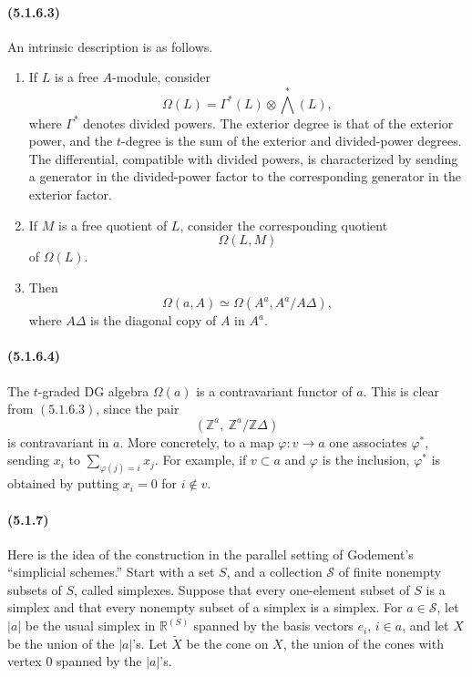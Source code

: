 \documentclass[11pt]{article}
\theoremstyle{remark}
\newcommand{\ZZ}{\mathbb{Z}}
\newcommand{\RR}{\mathbb{R}}
\begin{document}
\paragraph{(5.1.6.3)}
An intrinsic description is as follows.
\begin{enumerate}[label=\alph*)]
\item If \(L\) is a free \(A\)-module, consider
\[
\Omega(L)=\Gamma^*(L)\otimes \bigwedge^*(L),
\]
where \(\Gamma^*\) denotes divided powers.  The exterior degree is that of the exterior power, and the \(t\)-degree is the sum of the exterior and divided-power degrees.  The differential, compatible with divided powers, is characterized by sending a generator in the divided-power factor to the corresponding generator in the exterior factor.
\item If \(M\) is a free quotient of \(L\), consider the corresponding quotient
\[
\Omega(L,M)
\]
of \(\Omega(L)\).
\item Then
\[
\Omega(a,A)\simeq \Omega(A^a,A^a/A\Delta),
\]
where \(A\Delta\) is the diagonal copy of \(A\) in \(A^a\).
\end{enumerate}

\paragraph{(5.1.6.4)}
The \(t\)-graded DG algebra \(\Omega(a)\) is a contravariant functor of \(a\).  This is clear from \((5.1.6.3)\), since the pair
\[
(\ZZ^a,\ \ZZ^a/\ZZ\Delta)
\]
is contravariant in \(a\).  More concretely, to a map \(\varphi:v\to a\) one associates \(\varphi^*\), sending \(x_i\) to \(\sum_{\varphi(j)=i}x_j\).  For example, if \(v\subset a\) and \(\varphi\) is the inclusion, \(\varphi^*\) is obtained by putting \(x_i=0\) for \(i\notin v\).

\paragraph{(5.1.7)}
Here is the idea of the construction in the parallel setting of Godement's ``simplicial schemes.''  Start with a set \(S\), and a collection \(\mathcal S\) of finite nonempty subsets of \(S\), called simplexes.  Suppose that every one-element subset of \(S\) is a simplex and that every nonempty subset of a simplex is a simplex.  For \(a\in\mathcal S\), let \(|a|\) be the usual simplex in \(\RR^{(S)}\) spanned by the basis vectors \(e_i\), \(i\in a\), and let \(X\) be the union of the \(|a|\)'s.  Let \(\widetilde X\) be the cone on \(X\), the union of the cones with vertex \(0\) spanned by the \(|a|\)'s.
\end{document}

